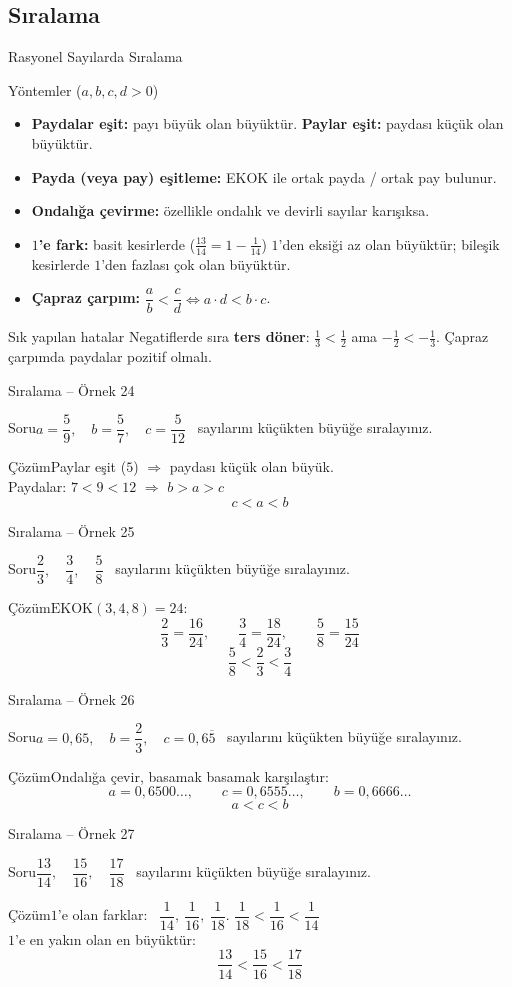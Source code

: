 \documentclass[aspectratio=169,11pt]{beamer}
\newcommand{\soru}[3]{%
\begin{frame}{#1}
  \begin{block}{Soru}\large #2\end{block}
  \pause
  \begin{exampleblock}{Çözüm}\large #3\end{exampleblock}
\end{frame}}
\newcommand{\ab}[1]{\overline{#1}}
\begin{document}
\subsection{Sıralama}
\begin{frame}{Rasyonel Sayılarda Sıralama}
\begin{block}{Yöntemler (\(a,b,c,d>0\))}
\begin{itemize}
\item \textbf{Paydalar eşit:} payı büyük olan büyüktür. \quad \textbf{Paylar eşit:} paydası küçük olan büyüktür.
\item \textbf{Payda (veya pay) eşitleme:} EKOK ile ortak payda / ortak pay bulunur.
\item \textbf{Ondalığa çevirme:} özellikle ondalık ve devirli sayılar karışıksa.
\item \textbf{\(1\)'e fark:} basit kesirlerde (\(\frac{13}{14}=1-\frac{1}{14}\)) \(1\)'den eksiği az olan büyüktür; bileşik kesirlerde \(1\)'den fazlası çok olan büyüktür.
\item \textbf{Çapraz çarpım:} \(\dfrac{a}{b}<\dfrac{c}{d}\iff a\cdot d<b\cdot c\).
\end{itemize}
\end{block}
\begin{alertblock}{Sık yapılan hatalar}
Negatiflerde sıra \textbf{ters döner}: \(\frac{1}{3}<\frac{1}{2}\) ama \(-\frac{1}{2}<-\frac{1}{3}\). \quad Çapraz çarpımda paydalar pozitif olmalı.
\end{alertblock}
\end{frame}

\soru{Sıralama -- Örnek 24}
{\(a=\dfrac{5}{9},\quad b=\dfrac{5}{7},\quad c=\dfrac{5}{12}\) \ sayılarını küçükten büyüğe sıralayınız.}
{Paylar eşit (\(5\)) \(\Rightarrow\) paydası küçük olan büyük.\\[3pt]
Paydalar: \(7<9<12\) \(\Rightarrow\) \(b>a>c\)
\[c<a<b\]}

\soru{Sıralama -- Örnek 25}
{\(\dfrac{2}{3},\quad \dfrac{3}{4},\quad \dfrac{5}{8}\) \ sayılarını küçükten büyüğe sıralayınız.}
{\(\text{EKOK}(3,4,8)=24\):
\[\frac{2}{3}=\frac{16}{24},\qquad \frac{3}{4}=\frac{18}{24},\qquad \frac{5}{8}=\frac{15}{24}\]
\[\frac{5}{8}<\frac{2}{3}<\frac{3}{4}\]}

\soru{Sıralama -- Örnek 26}
{\(a=0{,}65,\quad b=\dfrac{2}{3},\quad c=0{,}6\ab{5}\) \ sayılarını küçükten büyüğe sıralayınız.}
{Ondalığa çevir, basamak basamak karşılaştır:
\[a=0{,}6500\ldots,\qquad c=0{,}6555\ldots,\qquad b=0{,}6666\ldots\]
\[a<c<b\]}

\soru{Sıralama -- Örnek 27}
{\(\dfrac{13}{14},\quad \dfrac{15}{16},\quad \dfrac{17}{18}\) \ sayılarını küçükten büyüğe sıralayınız.}
{\(1\)'e olan farklar: \ \(\dfrac{1}{14},\ \dfrac{1}{16},\ \dfrac{1}{18}\). \quad \(\dfrac{1}{18}<\dfrac{1}{16}<\dfrac{1}{14}\)\\[3pt]
\(1\)'e en yakın olan en büyüktür:
\[\frac{13}{14}<\frac{15}{16}<\frac{17}{18}\]}
\end{document}

